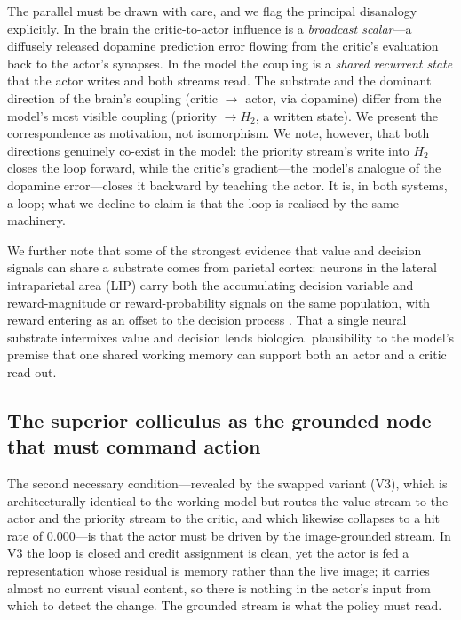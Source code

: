 The parallel must be drawn with care, and we flag the principal disanalogy explicitly. In the brain the critic-to-actor influence is a \emph{broadcast scalar}---a diffusely released dopamine prediction error flowing from the critic's evaluation back to the actor's synapses. In the model the coupling is a \emph{shared recurrent state} that the actor writes and both streams read. The substrate and the dominant direction of the brain's coupling (critic $\rightarrow$ actor, via dopamine) differ from the model's most visible coupling (priority $\rightarrow H_2$, a written state). We present the correspondence as motivation, not isomorphism. We note, however, that both directions genuinely co-exist in the model: the priority stream's write into $H_2$ closes the loop forward, while the critic's gradient---the model's analogue of the dopamine error---closes it backward by teaching the actor. It is, in both systems, a loop; what we decline to claim is that the loop is realised by the same machinery.

We further note that some of the strongest evidence that value and decision signals can share a substrate comes from parietal cortex: neurons in the lateral intraparietal area (LIP) carry both the accumulating decision variable and reward-magnitude or reward-probability signals on the same population, with reward entering as an offset to the decision process \citep{platt1999neural,sugrue2004matching}. That a single neural substrate intermixes value and decision lends biological plausibility to the model's premise that one shared working memory can support both an actor and a critic read-out.

\subsection{The superior colliculus as the grounded node that must command action}

The second necessary condition---revealed by the swapped variant (V3), which is architecturally identical to the working model but routes the value stream to the actor and the priority stream to the critic, and which likewise collapses to a hit rate of $0.000$---is that the actor must be driven by the image-grounded stream. In V3 the loop is closed and credit assignment is clean, yet the actor is fed a representation whose residual is memory rather than the live image; it carries almost no current visual content, so there is nothing in the actor's input from which to detect the change. The grounded stream is what the policy must read.

